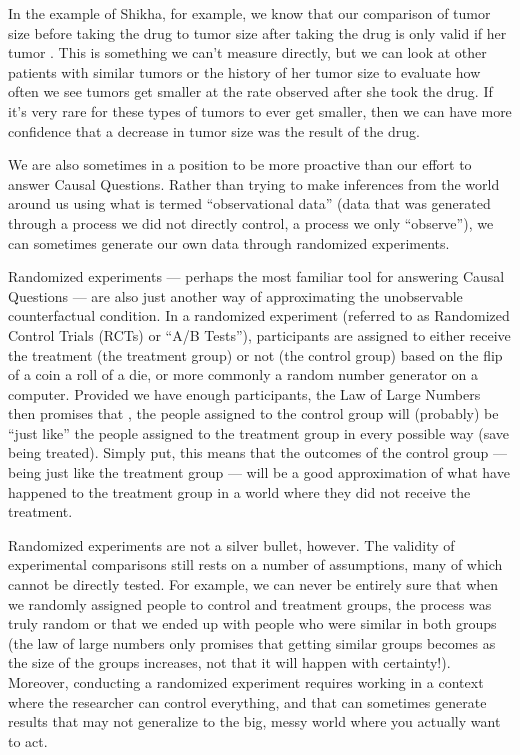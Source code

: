 \documentclass[letterpaper,10pt,english]{jupyterBook}
\begin{document}
\sphinxAtStartPar
In the example of Shikha, for example, we know that our comparison of tumor size before taking the drug to tumor size after taking the drug is only valid if her tumor . This is something we can’t measure directly, but we can look at other patients with similar tumors or the history of her tumor size to evaluate how often we see tumors get smaller at the rate observed after she took the drug. If it’s very rare for these types of tumors to ever get smaller, then we can have more confidence that a decrease in tumor size was the result of the drug.

\sphinxAtStartPar
We are also sometimes in a position to be more proactive than our effort to answer Causal Questions. Rather than trying to make inferences from the world around us using what is termed “observational data” (data that was generated through a process we did not directly control, a process we only “observe”), we can sometimes generate our own data through randomized experiments.

\sphinxAtStartPar
Randomized experiments — perhaps the most familiar tool for answering Causal Questions — are also just another way of approximating the unobservable counterfactual condition. In a randomized experiment (referred to as Randomized Control Trials (RCTs) or “A/B Tests”), participants are assigned to either receive the treatment (the treatment group) or not (the control group) based on the flip of a coin a roll of a die, or \sphinxhyphen{} more commonly \sphinxhyphen{} a random number generator on a computer. Provided we have enough participants, the Law of Large Numbers then promises that , the people assigned to the control group will (probably) be “just like” the people assigned to the treatment group in every possible way (save being treated). Simply put, this means that the outcomes of the control group — being just like the treatment group  — will be a good approximation of what  have happened to the treatment group in a world where they did not receive the treatment.

\sphinxAtStartPar
Randomized experiments are not a silver bullet, however. The validity of experimental comparisons still rests on a number of assumptions, many of which cannot be directly tested. For example, we can never be entirely sure that when we randomly assigned people to control and treatment groups, the process was truly random or that we ended up with people who were similar in both groups (the law of large numbers only promises that getting similar groups becomes  as the size of the groups increases, not that it will happen with certainty!). Moreover, conducting a randomized experiment requires working in a context where the researcher can control everything, and that can sometimes generate results that may not generalize to the big, messy world where you actually want to act.
\end{document}
